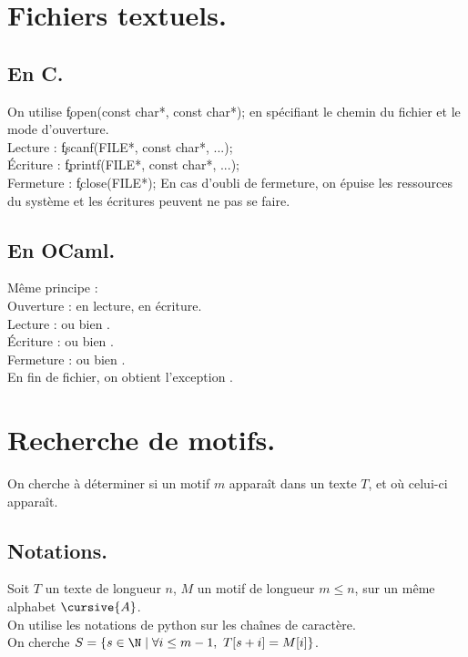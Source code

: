 \documentclass[french, 11pt]{article}
\begin{document}
\section{Fichiers textuels.}
\subsection{En C.}

\begin{defi}{}{}
    On utilise \c{fopen(const char*, const char*);} en spécifiant le chemin du fichier et le mode d'ouverture.\\
    Lecture : \c{fscanf(FILE*, const char*, ...);}\\
    Écriture : \c{fprintf(FILE*, const char*, ...);}\\
    Fermeture : \c{fclose(FILE*);}\n
    En cas d'oubli de fermeture, on épuise les ressources du système et les écritures peuvent ne pas se faire. 
\end{defi}

\subsection{En OCaml.}

\begin{defi}{}{}
    Même principe :\\
    Ouverture :  en lecture,  en écriture.\\
    Lecture :  ou bien .\\
    Écriture :  ou bien .\\
    Fermeture :  ou bien .\\
    En fin de fichier, on obtient l'exception .
\end{defi}

\section{Recherche de motifs.}

On cherche à déterminer si un motif $m$ apparaît dans un texte $T$, et où celui-ci apparaît.

\subsection{Notations.}

\begin{nota}{}{}
    Soit $T$ un texte de longueur $n$, $M$ un motif de longueur $m\leq n$, sur un même alphabet $\cursive{A}$.\\
    On utilise les notations de python sur les chaînes de caractère.\\
    On cherche $S=\{s\in\N \mid \forall i \leq m-1, ~ T[s+i]=M[i]\}$.
\end{nota}
\end{document}
